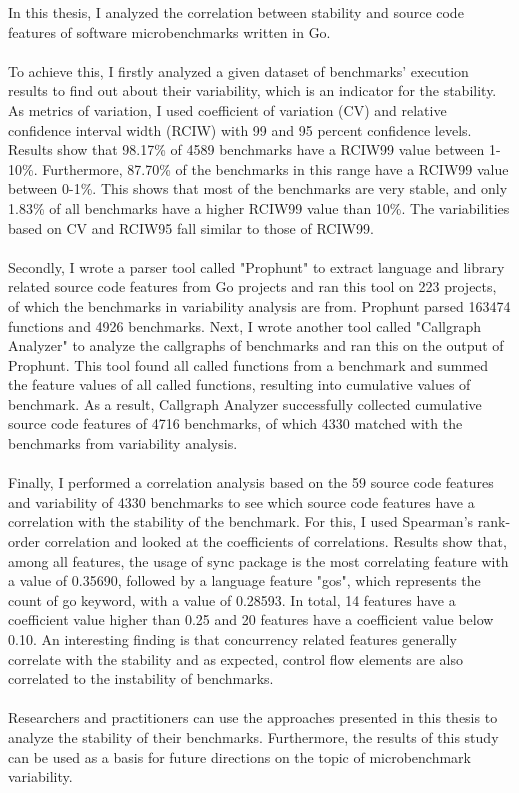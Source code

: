 \documentclass{seal_thesis}
\begin{document}
In this thesis, I analyzed the correlation between stability and source code features of software microbenchmarks written in Go.\\
\\
To achieve this, I firstly analyzed a given dataset of benchmarks' execution results to find out about their variability, which is an indicator for the stability. As metrics of variation, I used coefficient of variation (CV) and relative confidence interval width (RCIW) with 99 and 95 percent confidence levels. Results show that 98.17\% of 4589 benchmarks have a RCIW99 value between 1-10\%. Furthermore, 87.70\% of the benchmarks in this range have a RCIW99 value between 0-1\%. This shows that most of the benchmarks are very stable, and only 1.83\% of all benchmarks have a higher RCIW99 value than 10\%. The variabilities based on CV and RCIW95 fall similar to those of RCIW99.\\
\\
Secondly, I wrote a parser tool called "Prophunt" to extract language and library related source code features from Go projects and ran this tool on 223 projects, of which the benchmarks in variability analysis are from. Prophunt parsed 163474 functions and 4926 benchmarks. Next, I wrote another tool called "Callgraph Analyzer" to analyze the callgraphs of benchmarks and ran this on the output of Prophunt. This tool found all called functions from a benchmark and summed the feature values of all called functions, resulting into cumulative values of benchmark. As a result, Callgraph Analyzer successfully collected cumulative source code features of 4716 benchmarks, of which 4330 matched with the benchmarks from variability analysis.\\
\\
Finally, I performed a correlation analysis based on the 59 source code features and variability of 4330 benchmarks to see which source code features have a correlation with the stability of the benchmark. For this, I used Spearman's rank-order correlation and looked at the coefficients of correlations. Results show that, among all features, the usage of sync package is the most correlating feature with a value of 0.35690, followed by a language feature "gos", which represents the count of go keyword, with a value of 0.28593. In total, 14 features have a coefficient value higher than 0.25 and 20 features have a coefficient value below 0.10. An interesting finding is that concurrency related features generally correlate with the stability and as expected, control flow elements are also correlated to the instability of benchmarks.\\
\\
Researchers and practitioners can use the approaches presented in this thesis to analyze the stability of their benchmarks. Furthermore, the results of this study can be used as a basis for future directions on the topic of microbenchmark variability.
\end{document}
